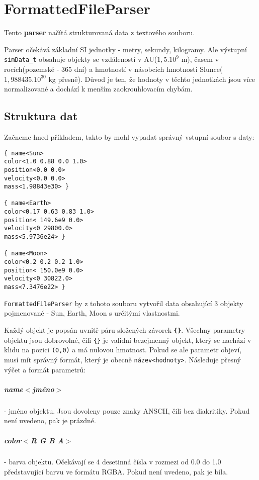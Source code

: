 \chapter{FormattedFileParser}
Tento \textbf{parser} načítá strukturovaná data z textového souboru. 

Parser očekává základní SI jednotky - metry, sekundy, kilogramy. Ale výstupní \texttt{simData\_t} obsahuje objekty se vzdáleností v AU($ 1,5.10^9 $ m), časem v rocích(pozemské - 365 dní) a hmotností v násobcích hmotnosti Slunce($ 1,988435.10^{30} $ kg přesně). Důvod je ten, že hodnoty v těchto jednotkách jsou více normalizované a dochází k menším zaokrouhlovacím chybám.

\section{Struktura dat}
\label{sec:strukturaDat}
Začneme hned příkladem, takto by mohl vypadat správný vstupní soubor s daty:
\begin{lstlisting}
{ name<Sun>
color<1.0 0.88 0.0 1.0>
position<0.0 0.0>
velocity<0.0 0.0>
mass<1.98843e30> }

{ name<Earth>
color<0.17 0.63 0.83 1.0>
position< 149.6e9 0.0>
velocity<0 29800.0>
mass<5.9736e24> }

{ name<Moon>
color<0.2 0.2 0.2 1.0>
position< 150.0e9 0.0>
velocity<0 30822.0>
mass<7.3476e22> }
\end{lstlisting}
\texttt{FormattedFileParser} by z tohoto souboru vytvořil data obsahující 3 objekty pojmenované - Sun, Earth, Moon s určitými vlastnostmi.

Každý objekt je popsán uvnitř páru složených závorek \textbf{\texttt{\{\}}}.
Všechny parametry objektu jsou dobrovolné, čili \lstinline|{}| je validní bezejmenný objekt, který se nachází v klidu na pozici \texttt{(0,0)} a má nulovou hmotnost. Pokud se ale parametr objeví, musí mít správný formát, který je obecně \texttt{název<hodnoty>}. Následuje přesný výčet a formát parametrů:
\paragraph{name$ < $jméno$ > $ } - jméno objektu. Jsou dovoleny pouze znaky ANSCII, čili bez diakritiky. Pokud není uvedeno, pak je prázdné.
\paragraph{color$ < $R G B A$ > $} - barva objektu. Očekávají se 4 desetinná čísla v rozmezi od 0.0 do 1.0 představující barvu ve formátu RGBA. Pokud není uvedeno, pak je bíla.
